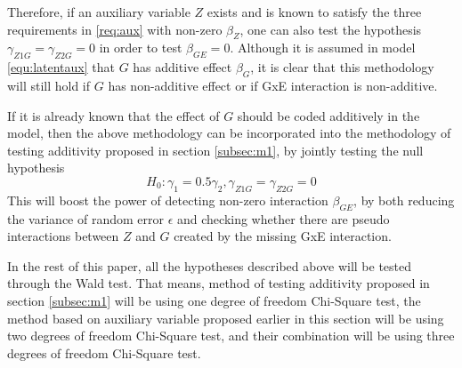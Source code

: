 Therefore, if an auxiliary variable $Z$ exists and is known to satisfy the three requirements in \ref{req:aux} with non-zero $\beta_Z$, one can also test the hypothesis $\gamma_{Z1G} = \gamma_{Z2G} = 0$ in order to test $\beta_{GE} = 0$. Although it is assumed in model \ref{equ:latentaux} that $G$ has additive effect $\beta_G$, it is clear that this methodology will still hold if $G$ has non-additive effect or if GxE interaction is non-additive.

If it is already known that the effect of $G$ should be coded additively in the model, then the above methodology can be incorporated into the methodology of testing additivity proposed in section \ref{subsec:m1}, by jointly testing the null hypothesis $$ H_0: \gamma_1 = 0.5 \gamma_2, \gamma_{Z1G} = \gamma_{Z2G} = 0$$ This will boost the power of detecting non-zero interaction $\beta_{GE}$, by both reducing the variance of random error $\epsilon$ and checking whether there are pseudo interactions between $Z$ and $G$ created by the missing GxE interaction.

In the rest of this paper, all the hypotheses described above will be tested through the Wald test. That means, method of testing additivity proposed in section \ref{subsec:m1} will be using one degree of freedom Chi-Square test, the method based on auxiliary variable proposed earlier in this section will be using two degrees of freedom Chi-Square test, and their combination will be using three degrees of freedom Chi-Square test.